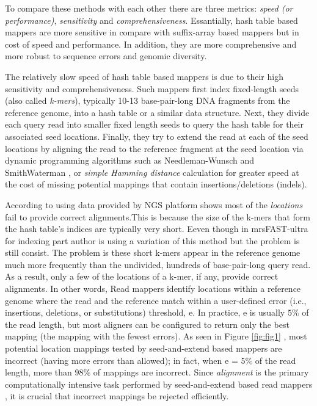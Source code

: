 To compare these  methods with each other there are three metrics: \emph{speed (or performance)}, \emph{sensitivity} and \emph{comprehensiveness}. Essantially, hash table based mappers are more sensitive in compare with suffix-array based mappers but in cost of speed and performance. In addition, they are more comprehensive and more robust to sequence errors and genomic diversity.

The relatively slow speed of hash table based mappers is due to their high sensitivity and comprehensiveness. Such mappers first index fixed-length seeds (also called \emph{k-mers}), typically 10-13 base-pair-long DNA fragments from the reference genome, into a hash table or a similar data structure. Next, they divide each query read into smaller fixed length seeds to query the hash table for their associated seed locations. Finally, they try to extend the read at each of the seed locations by aligning the read to the reference fragment at the seed location via dynamic programming algorithms such as Needleman-Wunsch \cite{needleman} and SmithWaterman \cite{smith1981identification}, or \emph{simple Hamming distance} calculation for greater speed at the cost of missing potential mappings that contain insertions/deletions (indels).

According to \cite{fasthash} using data provided by NGS platform shows most of the \textit{locations} fail to provide correct alignments.This is because the size of the k-mers that form the hash table’s indices are typically very short. Eeven though in mrsFAST-ultra\cite{mrsfastultra} for indexing part author is using a variation of this method but the problem is still consist. The problem is these short k-mers appear in the reference genome much more frequently than the undivided, hundreds of base-pair-long query read. As a result, only a few of the locations of a k-mer, if any, provide correct alignments. In other words, Read mappers identify locations within a reference genome where the read and the reference match within a user-defined error (i.e., insertions, deletions, or substitutions) threshold, e. In practice, e is usually $5\%$ of the read length, but most aligners can be configured to return only the best mapping (the mapping with the fewest errors). As seen in Figure \ref{fig:fig1} \cite{shd}, most potential location mappings tested by seed-and-extend based mappers are incorrect (having more errors than allowed); in fact, when e = $5\%$ of the read length, more than $98\%$ of mappings are incorrect. Since \emph{alignment} is the primary computationally intensive task performed by seed-and-extend based read mappers \cite{fasthash}, it is crucial that incorrect mappings be rejected efficiently. 

  